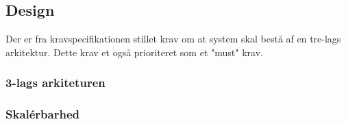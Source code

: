\subsection{Design}
Der er fra kravspecifikationen stillet krav om at system skal bestå af en
tre-lags arkitektur. Dette krav et også prioriteret som et "must" krav.

\subsubsection{3-lags arkiteturen}%
\label{ssub:3_lags_arkiteturen}


\subsubsection{Skalérbarhed}%
\label{ssub:skalerbarhed}



